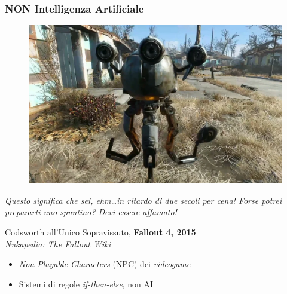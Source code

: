%
\begin{frame}[t,fragile] \frametitle{NON Intelligenza Artificiale}
	\vspace*{-15pt}
	\begin{center}
		\begin{minipage}[t]{0.6\textwidth}
			\centering
			\begin{figure}[ht]
				\includegraphics[width=\textwidth]{img/codsworth.png}
			\end{figure}
		\end{minipage}
		\begin{minipage}[t]{.6\textwidth}
			\renewcommand{\epigraphsize}{\tiny}
			\setlength{\afterepigraphskip}{0pt}
			\setlength{\beforeepigraphskip}{5pt}
			\setlength{\epigraphwidth}{\textwidth}
			\epigraph{\textit{Questo significa che sei, ehm\ldots in ritardo di due secoli per cena! Forse potrei prepararti uno spuntino? Devi essere affamato!}}{Codsworth all'Unico Sopravissuto, \textbf{Fallout 4, 2015}\\\vspace*{0pt}\textit{\textcopyright Nukapedia: The Fallout Wiki}}
		\end{minipage}
	\end{center}
	\begin{itemize}[leftmargin=10pt,align=right]
		\item[\alert{\faHandORight}] \alert{\textit{Non-Playable Characters}} (NPC) dei \textit{videogame} 
		\onslide<3->\item[\alert{\faHandORight}] Sistemi di regole \textit{if-then-else}, \alert{non} AI
	\end{itemize}
\end{frame}